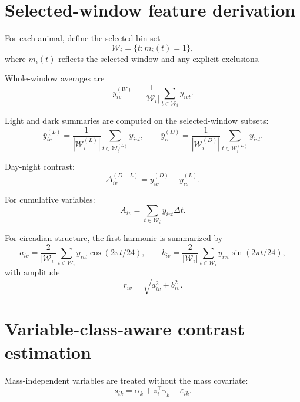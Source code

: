 \documentclass[11pt]{article}
\begin{document}
\section{Selected-window feature derivation}
For each animal, define the selected bin set
\begin{equation}
\mathcal{W}_i = \{ t : m_i(t) = 1 \},
\end{equation}
where $m_i(t)$ reflects the selected window and any explicit exclusions.

Whole-window averages are
\begin{equation}
\bar{y}^{(W)}_{iv} = \frac{1}{|\mathcal{W}_i|} \sum_{t \in \mathcal{W}_i} y_{ivt}.
\end{equation}

Light and dark summaries are computed on the selected-window subsets:
\begin{equation}
\bar{y}^{(L)}_{iv} = \frac{1}{|\mathcal{W}^{(L)}_i|} \sum_{t \in \mathcal{W}^{(L)}_i} y_{ivt},
\qquad
\bar{y}^{(D)}_{iv} = \frac{1}{|\mathcal{W}^{(D)}_i|} \sum_{t \in \mathcal{W}^{(D)}_i} y_{ivt}.
\end{equation}

Day-night contrast:
\begin{equation}
\Delta^{(D-L)}_{iv} = \bar{y}^{(D)}_{iv} - \bar{y}^{(L)}_{iv}.
\end{equation}

For cumulative variables:
\begin{equation}
A_{iv} = \sum_{t \in \mathcal{W}_i} y_{ivt}\Delta t.
\end{equation}

For circadian structure, the first harmonic is summarized by
\begin{equation}
a_{iv} = \frac{2}{|\mathcal{W}_i|}\sum_{t \in \mathcal{W}_i} y_{ivt}\cos(2\pi t / 24),
\qquad
b_{iv} = \frac{2}{|\mathcal{W}_i|}\sum_{t \in \mathcal{W}_i} y_{ivt}\sin(2\pi t / 24),
\end{equation}
with amplitude
\begin{equation}
r_{iv} = \sqrt{a_{iv}^2 + b_{iv}^2}.
\end{equation}

\section{Variable-class-aware contrast estimation}
Mass-independent variables are treated without the mass covariate:
\begin{equation}
s_{ik} = \alpha_k + z_i^\top \gamma_k + \varepsilon_{ik}.
\end{equation}
\end{document}
